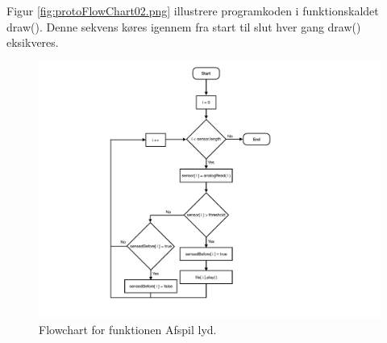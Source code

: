 Figur \ref{fig:protoFlowChart02.png} illustrere programkoden i funktionskaldet draw(). Denne sekvens køres igennem fra start til slut hver gang draw() eksikveres.            

\begin{figure}
\centering
\includegraphics[scale=0.6]{Figure/protoFlowChart03.pdf}
\caption{
Flowchart for funktionen Afspil lyd. }
\label{fig:protoFlowChart03.pdf}
\end{figure}

 